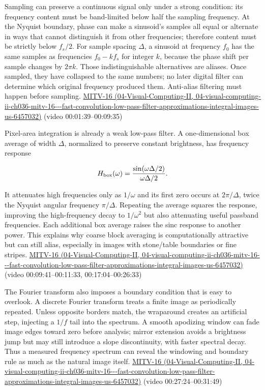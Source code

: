 Sampling can preserve a continuous signal only under a strong condition: its frequency content must be band-limited below half the sampling frequency. At the Nyquist boundary, phase can make a sinusoid's samples all equal or alternate in ways that cannot distinguish it from other frequencies; therefore content must be strictly below \(f_s/2\). For sample spacing \(\Delta\), a sinusoid at frequency \(f_0\) has the same samples as frequencies \(f_0-kf_s\) for integer \(k\), because the phase shift per sample changes by \(2\pi k\). Those indistinguishable alternatives are aliases. Once sampled, they have collapsed to the same numbers; no later digital filter can determine which original frequency produced them. Anti-alias filtering must happen before sampling. \href{../04-Visual-Computing-II/main.pdf\#nameddest=04-visual-computing-ii-ch036-mitv-16---fast-convolution-low-pass-filter-approximations-integral-images-us-6457032}{MITV-16 (04-Visual-Computing-II, 04-visual-computing-ii-ch036-mitv-16-\/-\/-fast-convolution-low-pass-filter-approximations-integral-images-us-6457032)} (video 00:01:39--00:09:35)

Pixel-area integration is already a weak low-pass filter. A one-dimensional box average of width \(\Delta\), normalized to preserve constant brightness, has frequency response

\[
H_{\rm box}(\omega)=\frac{\sin(\omega\Delta/2)}{\omega\Delta/2}.
\]

It attenuates high frequencies only as \(1/\omega\) and its first zero occurs at \(2\pi/\Delta\), twice the Nyquist angular frequency \(\pi/\Delta\). Repeating the average squares the response, improving the high-frequency decay to \(1/\omega^2\) but also attenuating useful passband frequencies. Each additional box average raises the sinc response to another power. This explains why coarse block averaging is computationally attractive but can still alias, especially in images with stone/table boundaries or fine stripes. \href{../04-Visual-Computing-II/main.pdf\#nameddest=04-visual-computing-ii-ch036-mitv-16---fast-convolution-low-pass-filter-approximations-integral-images-us-6457032}{MITV-16 (04-Visual-Computing-II, 04-visual-computing-ii-ch036-mitv-16-\/-\/-fast-convolution-low-pass-filter-approximations-integral-images-us-6457032)} (video 00:09:41--00:11:33, 00:17:04--00:26:33)

The Fourier transform also imposes a boundary condition that is easy to overlook. A discrete Fourier transform treats a finite image as periodically repeated. Unless opposite borders match, the wraparound creates an artificial step, injecting a \(1/f\) tail into the spectrum. A smooth apodizing window can fade image edges toward zero before analysis; mirror extension avoids a brightness jump but may still introduce a slope discontinuity, with faster spectral decay. Thus a measured frequency spectrum can reveal the windowing and boundary rule as much as the natural image itself. \href{../04-Visual-Computing-II/main.pdf\#nameddest=04-visual-computing-ii-ch036-mitv-16---fast-convolution-low-pass-filter-approximations-integral-images-us-6457032}{MITV-16 (04-Visual-Computing-II, 04-visual-computing-ii-ch036-mitv-16-\/-\/-fast-convolution-low-pass-filter-approximations-integral-images-us-6457032)} (video 00:27:24--00:31:49)

